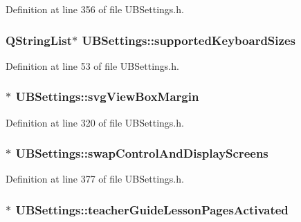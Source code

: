 Definition at line 356 of file U\-B\-Settings.\-h.

\hypertarget{class_u_b_settings_a3d9bffe65c4eaa52e30e086ccf77617d}{
\subsubsection[{supported\-Keyboard\-Sizes}]{\setlength{\rightskip}{0pt plus 5cm}Q\-String\-List$\ast$ U\-B\-Settings\-::supported\-Keyboard\-Sizes}}\label{db/d66/class_u_b_settings_a3d9bffe65c4eaa52e30e086ccf77617d}


Definition at line 53 of file U\-B\-Settings.\-h.

\hypertarget{class_u_b_settings_ac33abd6b8efc6d97f4d04e16e22bd215}{
\subsubsection[{svg\-View\-Box\-Margin}]{$\ast$ U\-B\-Settings\-::svg\-View\-Box\-Margin}}\label{db/d66/class_u_b_settings_ac33abd6b8efc6d97f4d04e16e22bd215}


Definition at line 320 of file U\-B\-Settings.\-h.

\hypertarget{class_u_b_settings_a677486ca02da069640c8db3c2f9b1593}{
\subsubsection[{swap\-Control\-And\-Display\-Screens}]{$\ast$ U\-B\-Settings\-::swap\-Control\-And\-Display\-Screens}}\label{db/d66/class_u_b_settings_a677486ca02da069640c8db3c2f9b1593}


Definition at line 377 of file U\-B\-Settings.\-h.

\hypertarget{class_u_b_settings_aa80b727473c0beb0534b3aa274582408}{
\subsubsection[{teacher\-Guide\-Lesson\-Pages\-Activated}]{$\ast$ U\-B\-Settings\-::teacher\-Guide\-Lesson\-Pages\-Activated}}\label{db/d66/class_u_b_settings_aa80b727473c0beb0534b3aa274582408}


